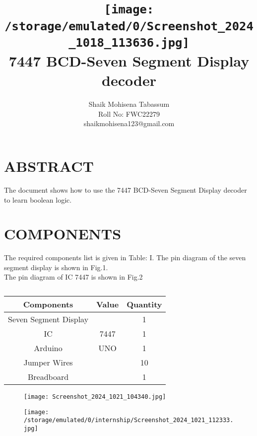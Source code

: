 \documentclass[conference]{IEEEtran}
\title{
\vspace{1cm}
{\texttt{[image: /storage/emulated/0/Screenshot\_2024\_1018\_113636.jpg]} \\ 7447 BCD-Seven Segment Display decoder} }
\author{Shaik Mohisena Tabassum \\ Roll No: FWC22279 \\ shaikmohisena123@gmail.com}
\begin{document}
\maketitle
 \section {ABSTRACT}
 The document shows how to use the 7447 BCD-Seven Segment Display decoder to learn boolean logic.
\section{COMPONENTS}
The required components list is given in Table: I. The pin diagram of the seven segment display is shown in Fig.1. \\
The pin diagram of IC 7447 is shown in Fig.2 
 \begin{table} [htbp]
\centering
\begin{tabular}{| c | c | c |} \hline
\textbf{Components} & \textbf{Value} & \textbf{Quantity} \\\hline
Seven Segment Display & & 1 \\ \hline
IC & 7447 & 1 \\ \hline 
Arduino & UNO & 1 \\ \hline
Jumper Wires &  & 10 \\ \hline
Breadboard & & 1 \\ 
\hline
\end{tabular}
\vspace{0.1cm}
\caption{\label{tab:widgets}}
\end{table}
\vspace {0.1cm}
\begin{figure}[h]                                
\centering                                       
\texttt{[image: Screenshot\_2024\_1021\_104340.jpg]}                            
\caption{\label{fig:Gates}}                    
\end{figure}

\begin{figure}[h]
\centering
\texttt{[image: /storage/emulated/0/internship/Screenshot\_2024\_1021\_112333.jpg]}
\caption{\label{fig:Gates}}
\end{figure}
\end{document}
